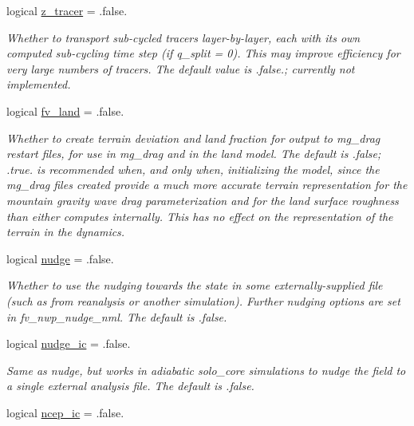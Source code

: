 \begin{DoxyCompactItemize}
logical \hyperlink{structfv__arrays__mod_1_1fv__flags__type_a323755a242c37f393d939ac5626bb209}{z\-\_\-tracer} = .false.
\begin{DoxyCompactList}\small\item\em Whether to transport sub-\/cycled tracers layer-\/by-\/layer, each with its own computed sub-\/cycling time step (if q\-\_\-split = 0). This may improve efficiency for very large numbers of tracers. The default value is .false.; currently not implemented. \end{DoxyCompactList}\item 
logical \hyperlink{structfv__arrays__mod_1_1fv__flags__type_ac4156a48b9e2d608c378b8ec882fe2e3}{fv\-\_\-land} = .false.
\begin{DoxyCompactList}\small\item\em Whether to create terrain deviation and land fraction for output to mg\-\_\-drag restart files, for use in mg\-\_\-drag and in the land model. The default is .false; .true. is recommended when, and only when, initializing the model, since the mg\-\_\-drag files created provide a much more accurate terrain representation for the mountain gravity wave drag parameterization and for the land surface roughness than either computes internally. This has no effect on the representation of the terrain in the dynamics. \end{DoxyCompactList}\item 
logical \hyperlink{structfv__arrays__mod_1_1fv__flags__type_a2071b6839462ecbe65b18ec014b7891c}{nudge} = .false.
\begin{DoxyCompactList}\small\item\em Whether to use the nudging towards the state in some externally-\/supplied file (such as from reanalysis or another simulation). Further nudging options are set in fv\-\_\-nwp\-\_\-nudge\-\_\-nml. The default is .false. \end{DoxyCompactList}\item 
logical \hyperlink{structfv__arrays__mod_1_1fv__flags__type_abfb0cfc0c4c35db9eace0aec7f7b0986}{nudge\-\_\-ic} = .false.
\begin{DoxyCompactList}\small\item\em Same as nudge, but works in adiabatic solo\-\_\-core simulations to nudge the field to a single external analysis file. The default is .false. \end{DoxyCompactList}\item 
logical \hyperlink{structfv__arrays__mod_1_1fv__flags__type_afbe96b343538a9871a35409abfdb09d3}{ncep\-\_\-ic} = .false.

\end{DoxyCompactItemize}
